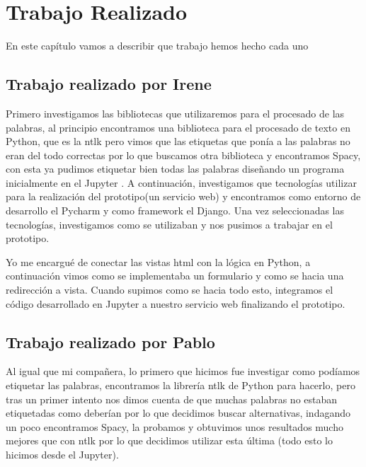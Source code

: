 \chapter{Trabajo Realizado}
\label{cap:TrabajoRealizado}

\begin{resumen}
En este capítulo vamos a describir que trabajo hemos hecho cada uno
\end{resumen}

\section{Trabajo realizado por Irene}
\label{cap:sec:trabajo_Irene}

Primero investigamos las bibliotecas que utilizaremos para el procesado de las palabras, al principio encontramos una biblioteca para el procesado de texto en Python, que es la ntlk pero vimos que las etiquetas que ponía a las palabras no eran del todo correctas por lo que buscamos otra biblioteca y encontramos Spacy, con esta ya pudimos etiquetar bien todas las palabras diseñando un programa inicialmente en el Jupyter . A continuación, investigamos que tecnologías utilizar para la realización del prototipo(un servicio web) y encontramos como entorno de desarrollo el Pycharm y como framework el Django. Una vez seleccionadas las tecnologías, investigamos como se utilizaban y nos pusimos a trabajar en el prototipo.

Yo me encargué de conectar las vistas html con la lógica en Python, a continuación vimos como se implementaba un formulario y como se hacia una redirección a vista. Cuando supimos como se hacia todo esto, integramos el código desarrollado en Jupyter a nuestro servicio web finalizando el prototipo.



\section{Trabajo realizado por Pablo}
\label{cap:sec:trabajo_Pablo}

Al igual que mi compañera, lo primero que hicimos fue investigar como podíamos etiquetar las palabras, encontramos la librería ntlk de Python para hacerlo, pero tras un primer intento nos dimos cuenta de que muchas palabras no estaban etiquetadas como deberían por lo que decidimos buscar alternativas, indagando un poco encontramos Spacy, la probamos y obtuvimos unos resultados mucho mejores que con ntlk por lo que decidimos utilizar esta última (todo esto lo hicimos desde el Jupyter). 

